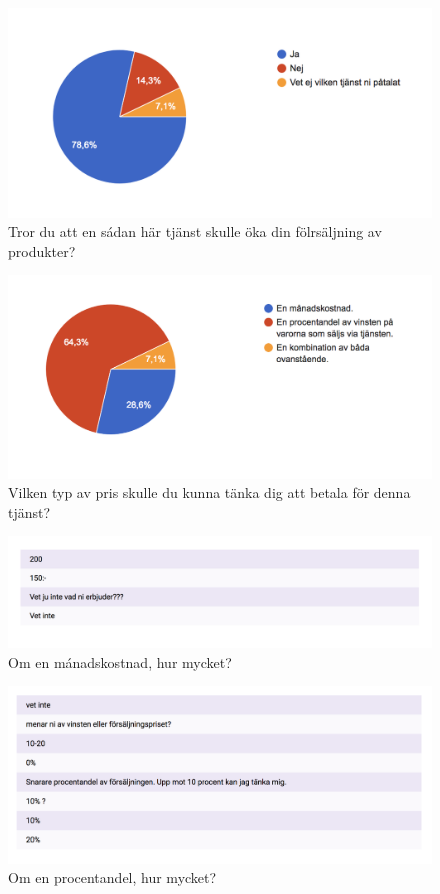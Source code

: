 \documentclass[10pt,a4paper,oneside]{article}
\begin{document}
\begin{figure}
	\includegraphics[scale=0.6]{10.png}
	\caption{Tror du att en s\'adan h\"ar tj\"anst skulle \"oka din f\"olrs\"aljning av produkter?}
\end{figure}

\begin{figure}
	\includegraphics[scale=0.6]{11.png}
	\caption{Vilken typ av pris skulle du kunna t\"anka dig att betala för denna tj\"anst?}
\end{figure}

\begin{figure}
	\includegraphics[scale=0.6]{12.png}
	\caption{Om en m\'anadskostnad, hur mycket?}
\end{figure}

\begin{figure}
	\includegraphics[scale=0.6]{13.png}
	\caption{Om en procentandel, hur mycket?}
\end{figure}
\end{document}
